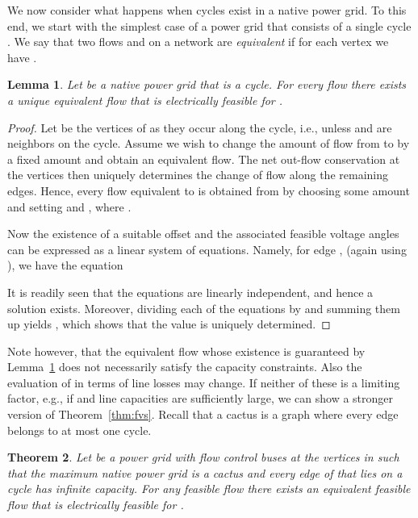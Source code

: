 \documentclass{article}[11pt,a4paper]
\newtheorem{theorem}{Theorem}[section]
\newtheorem{lemma}[theorem]{Lemma}
\begin{document}
We now consider what happens when cycles exist in a native power
grid.  To this end, we start with the simplest case of a power grid
that consists of a single cycle .  We say that two flows  and
 on a network  are \emph{equivalent} if for each vertex
 we have .
\begin{lemma}
  \label{lem:cycle-equivalent-flow}
  Let  be a native power grid that is a cycle.  For every
  flow  there exists a unique equivalent flow  that is
  electrically feasible for .
\end{lemma}
\begin{proof}
  Let  be the vertices of  as they occur along the
  cycle, i.e.,  unless  and  are neighbors on the cycle.
Assume we wish to change the amount of flow
  from  to  by a fixed amount  and obtain an
  equivalent flow.  The net out-flow conservation at the vertices then
  uniquely determines the change of flow along the remaining edges.
  Hence, every flow  equivalent to  is obtained from  by
  choosing some amount  and setting  and , where .

  Now the existence of a suitable offset  and the associated
  feasible voltage angles can be expressed as a linear system of equations.
  Namely, for edge ,  (again using
  ), we have the equation 
   
\iffalse
  \begin{figure*}[t]
    \centering
    
  \end{figure*}
\fi
It is readily seen that the  equations are linearly independent,
and hence a solution exists.  Moreover, dividing each of the equations
by  and summing them up yields , which shows
  that the value  is uniquely determined.
\end{proof}
Note however, that the equivalent flow  whose existence is
guaranteed by Lemma~\ref{lem:cycle-equivalent-flow} does not
necessarily satisfy the capacity constraints. Also the evaluation of
 in terms of line losses may change.  If neither of these is a
limiting factor, e.g., if  and line capacities are
sufficiently large, we can show a stronger version of
Theorem~\ref{thm:fvs}.  Recall that a cactus is a graph where every edge belongs
to at most one cycle.
\begin{theorem}
  \label{thm:cactus}
  Let  be a power grid with flow control buses at the vertices in  such
  that the maximum native power grid  is a cactus  and every edge
  of  that lies on a cycle has infinite capacity. For any feasible flow  
  there exists an equivalent feasible flow 
  that is electrically feasible for .
\end{theorem}
\end{document}

